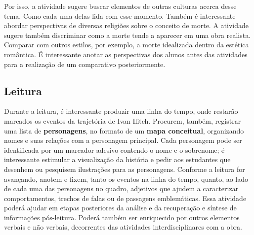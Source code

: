 \documentclass[12pt]{extarticle}
\begin{document}
Por isso, a atividade sugere buscar elementos de outras culturas acerca
desse tema. Como cada uma delas lida com esse momento. Também é
interessante abordar perspectivas de diversas religiões sobre o conceito
de morte. A atividade sugere também discriminar como a morte tende a
aparecer em uma obra realista. Comparar com outros estilos, por exemplo,
a morte idealizada dentro da estética romântica. É interessante anotar
as perspectivas dos alunos antes das atividades para a realização de um
comparativo posteriormente.

\subsection{Leitura}



Durante a leitura, é interessante produzir uma linha do
tempo, onde restarão marcados os eventos da trajetória de Ivan Ilitch.
Procurem, também, registrar uma lista de \textbf{personagens}, no
formato de um \textbf{mapa conceitual}, organizando nomes e suas
relações com a personagem principal. Cada personagem pode ser
identificada por um marcador adesivo contendo o nome e o sobrenome; é
interessante estimular a visualização da história e pedir aos estudantes
que desenhem ou pesquisem ilustrações para as personagens. Conforme a
leitura for avançando, anotem e fixem, tanto os eventos na linha do
tempo, quanto, ao lado de cada uma das personagens no quadro, adjetivos
que ajudem a caracterizar comportamentos, trechos de falas ou de
passagens emblemáticas. Essa atividade poderá ajudar em etapas
posteriores da análise e da recuperação e síntese de informações
pós-leitura. Poderá também ser enriquecido por outros elementos verbais
e não verbais, decorrentes das atividades interdisciplinares com a obra.
\end{document}
